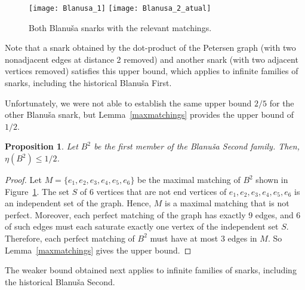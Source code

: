 \documentclass{article}
\newtheorem{proposition}[thm]{Proposition}
\begin{document}
\begin{figure}[ht]
\centering
\texttt{[image: Blanusa\_1]} \hspace{.5cm} \texttt{[image: Blanusa\_2\_atual]}
\caption{Both Blanu\v{s}a snarks with the relevant matchings.}
\label{fig:B1}
\end{figure}

Note that a snark obtained by the dot-product of the Petersen graph (with two nonadjacent edges at distance 2 removed) and another snark (with two adjacent vertices removed) satisfies this upper bound, which applies to infinite families of snarks, including the historical Blanu\v{s}a First.

Unfortunately, we were not able to establish the same upper bound $2/5$ for the other Blanu\v{s}a snark, but Lemma~\ref{maxmatchings} provides the upper bound of $1/2$.

\begin{proposition}\label{B2}
Let $B^2$ be the first member of the Blanu\v{s}a Second family. Then, $\eta(B^2) \leq 1/2$.
\end{proposition}
\begin{proof}
Let $M=\{e_1,e_2,e_3,e_4,e_5,e_6\}$ be the maximal matching of $B^2$ shown in Figure~\ref{fig:B1}. The set $S$ of 6 vertices that are not end vertices of $e_1,e_2,e_3,e_4,e_5,e_6$ is an independent set of the graph. Hence, $M$ is a maximal matching that is not perfect. Moreover, each perfect matching of the graph has exactly 9 edges, and 6 of such edges must each saturate exactly one vertex of the independent set $S$. Therefore, each perfect matching of $B^2$ must have at most 3 edges in $M$. So Lemma~\ref{maxmatchings} gives the upper bound.
\end{proof}

The weaker bound obtained next applies to infinite families of snarks, including the historical Blanu\v{s}a Second.
\end{document}
